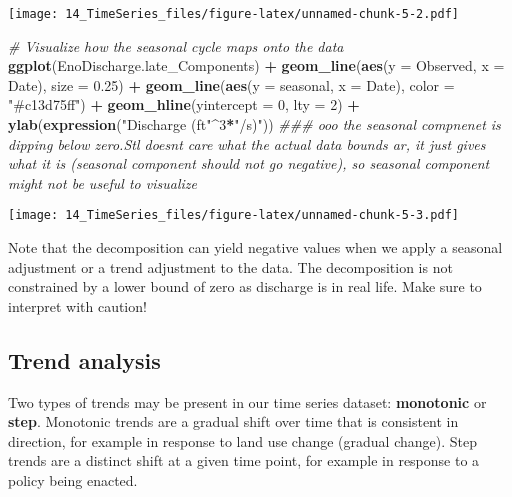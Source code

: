 \documentclass[
]{article}
\newenvironment{Shaded}{\begin{snugshade}}{\end{snugshade}}
\newcommand{\CommentTok}[1]{\textcolor[rgb]{0.56,0.35,0.01}{\textit{#1}}}
\newcommand{\DataTypeTok}[1]{\textcolor[rgb]{0.13,0.29,0.53}{#1}}
\newcommand{\DecValTok}[1]{\textcolor[rgb]{0.00,0.00,0.81}{#1}}
\newcommand{\FloatTok}[1]{\textcolor[rgb]{0.00,0.00,0.81}{#1}}
\newcommand{\KeywordTok}[1]{\textcolor[rgb]{0.13,0.29,0.53}{\textbf{#1}}}
\newcommand{\NormalTok}[1]{#1}
\newcommand{\OperatorTok}[1]{\textcolor[rgb]{0.81,0.36,0.00}{\textbf{#1}}}
\newcommand{\StringTok}[1]{\textcolor[rgb]{0.31,0.60,0.02}{#1}}
\begin{document}
\texttt{[image: 14\_TimeSeries\_files/figure-latex/unnamed-chunk-5-2.pdf]}

\begin{Shaded}
\begin{Highlighting}[]
\CommentTok{\# Visualize how the seasonal cycle maps onto the data}
\KeywordTok{ggplot}\NormalTok{(EnoDischarge.late\_Components) }\OperatorTok{+}
\StringTok{  }\KeywordTok{geom\_line}\NormalTok{(}\KeywordTok{aes}\NormalTok{(}\DataTypeTok{y =}\NormalTok{ Observed, }\DataTypeTok{x =}\NormalTok{ Date),  }\DataTypeTok{size =} \FloatTok{0.25}\NormalTok{) }\OperatorTok{+}
\StringTok{  }\KeywordTok{geom\_line}\NormalTok{(}\KeywordTok{aes}\NormalTok{(}\DataTypeTok{y =}\NormalTok{ seasonal, }\DataTypeTok{x =}\NormalTok{ Date), }\DataTypeTok{color =} \StringTok{"\#c13d75ff"}\NormalTok{) }\OperatorTok{+}
\StringTok{  }\KeywordTok{geom\_hline}\NormalTok{(}\DataTypeTok{yintercept =} \DecValTok{0}\NormalTok{, }\DataTypeTok{lty =} \DecValTok{2}\NormalTok{) }\OperatorTok{+}
\StringTok{  }\KeywordTok{ylab}\NormalTok{(}\KeywordTok{expression}\NormalTok{(}\StringTok{"Discharge (ft"}\OperatorTok{\^{}}\DecValTok{3}\OperatorTok{*}\StringTok{"/s)"}\NormalTok{)) }\CommentTok{\#\#\# ooo the seasonal compnenet is dipping below zero.Stl doesnt care what the actual data bounds ar, it just gives what it is (seasonal component should not go negative), so seasonal component might not be useful to visualize}
\end{Highlighting}
\end{Shaded}

\texttt{[image: 14\_TimeSeries\_files/figure-latex/unnamed-chunk-5-3.pdf]}

Note that the decomposition can yield negative values when we apply a
seasonal adjustment or a trend adjustment to the data. The decomposition
is not constrained by a lower bound of zero as discharge is in real
life. Make sure to interpret with caution!

\hypertarget{trend-analysis}{%
\subsection{Trend analysis}\label{trend-analysis}}

Two types of trends may be present in our time series dataset:
\textbf{monotonic} or \textbf{step}. Monotonic trends are a gradual
shift over time that is consistent in direction, for example in response
to land use change (gradual change). Step trends are a distinct shift at
a given time point, for example in response to a policy being enacted.
\end{document}
